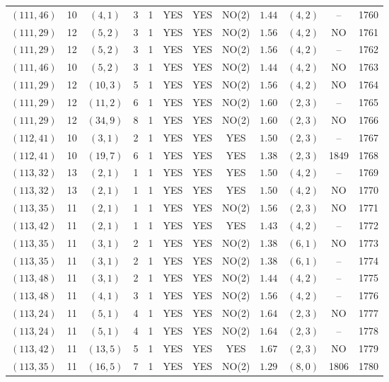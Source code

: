 \begin{longtable}{|c|c|c|c|c|c|c|c|c|c|c|c|}
$(111,46)$ & 10 & $(4,1)$ & 3 & 1 & YES & YES & NO(2) & $1.44$ & $(4,2)$ & -- & 1760\\
$(111,29)$ & 12 & $(5,2)$ & 3 & 1 & YES & YES & NO(2) & $1.56$ & $(4,2)$ & NO & 1761\\
$(111,29)$ & 12 & $(5,2)$ & 3 & 1 & YES & YES & NO(2) & $1.56$ & $(4,2)$ & -- & 1762\\
$(111,46)$ & 10 & $(5,2)$ & 3 & 1 & YES & YES & NO(2) & $1.44$ & $(4,2)$ & NO & 1763\\
$(111,29)$ & 12 & $(10,3)$ & 5 & 1 & YES & YES & NO(2) & $1.56$ & $(4,2)$ & NO & 1764\\
$(111,29)$ & 12 & $(11,2)$ & 6 & 1 & YES & YES & NO(2) & $1.60$ & $(2,3)$ & -- & 1765\\
$(111,29)$ & 12 & $(34,9)$ & 8 & 1 & YES & YES & NO(2) & $1.60$ & $(2,3)$ & NO & 1766\\
$(112,41)$ & 10 & $(3,1)$ & 2 & 1 & YES & YES & YES & $1.50$ & $(2,3)$ & -- & 1767\\
$(112,41)$ & 10 & $(19,7)$ & 6 & 1 & YES & YES & YES & $1.38$ & $(2,3)$ & 1849 & 1768\\
$(113,32)$ & 13 & $(2,1)$ & 1 & 1 & YES & YES & YES & $1.50$ & $(4,2)$ & -- & 1769\\
$(113,32)$ & 13 & $(2,1)$ & 1 & 1 & YES & YES & YES & $1.50$ & $(4,2)$ & NO & 1770\\
$(113,35)$ & 11 & $(2,1)$ & 1 & 1 & YES & YES & NO(2) & $1.56$ & $(2,3)$ & NO & 1771\\
$(113,42)$ & 11 & $(2,1)$ & 1 & 1 & YES & YES & YES & $1.43$ & $(4,2)$ & -- & 1772\\
$(113,35)$ & 11 & $(3,1)$ & 2 & 1 & YES & YES & NO(2) & $1.38$ & $(6,1)$ & NO & 1773\\
$(113,35)$ & 11 & $(3,1)$ & 2 & 1 & YES & YES & NO(2) & $1.38$ & $(6,1)$ & -- & 1774\\
$(113,48)$ & 11 & $(3,1)$ & 2 & 1 & YES & YES & NO(2) & $1.44$ & $(4,2)$ & -- & 1775\\
$(113,48)$ & 11 & $(4,1)$ & 3 & 1 & YES & YES & NO(2) & $1.56$ & $(4,2)$ & -- & 1776\\
$(113,24)$ & 11 & $(5,1)$ & 4 & 1 & YES & YES & NO(2) & $1.64$ & $(2,3)$ & NO & 1777\\
$(113,24)$ & 11 & $(5,1)$ & 4 & 1 & YES & YES & NO(2) & $1.64$ & $(2,3)$ & -- & 1778\\
$(113,42)$ & 11 & $(13,5)$ & 5 & 1 & YES & YES & YES & $1.67$ & $(2,3)$ & NO & 1779\\
$(113,35)$ & 11 & $(16,5)$ & 7 & 1 & YES & YES & NO(2) & $1.29$ & $(8,0)$ & 1806 & 1780\\

\end{longtable}
